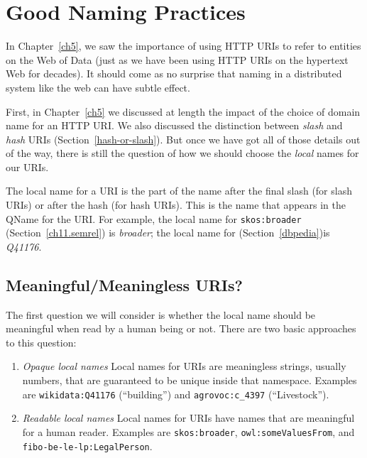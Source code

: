

\section{Good Naming Practices}

In Chapter~\ref{ch5}, we saw the importance of using HTTP URIs to refer to entities
on the Web of Data (just as we have been using HTTP URIs on the hypertext Web for decades).
It should come as no surprise that naming in a distributed system like the web
can have subtle effect. 

First, in Chapter~\ref{ch5} we discussed at length the impact of the choice of 
domain name for an HTTP URI.   We also discussed the distinction between \emph{slash} and 
\emph{hash} URIs (Section~\ref{hash-or-slash}).  But once we have got all of those details 
out of the way, there is still the question of how we should choose the \emph{local} names 
for our URIs. 

The local name for a URI is the part of the name after the final slash (for slash URIs) or 
after the hash (for hash URIs).  This is the name that appears in the QName for the URI. 
For example, the local name for \texttt{skos:broader}  (Section~\ref{ch11.semrel}) is 
\emph{broader}; the local name for  (Section~\ref{dbpedia})is 
\emph{Q41176}. 

\subsection{Meaningful/Meaningless URIs?}

The first question we will consider is whether the local name should be meaningful
when read by a human being or not.  There are two basic approaches to this question: 

\begin{enumerate}
    \item \emph{Opaque local names} Local names for URIs are meaningless strings, usually numbers, that are guaranteed to be unique inside that namespace.  Examples are \texttt{wikidata:Q41176} (``building'') and \texttt{agrovoc:c\_4397} (``Livestock''). 
    \item \emph{Readable local names} Local names for URIs have names that are meaningful
    for a human reader.  Examples are \texttt{skos:broader}, \texttt{owl:someValuesFrom}, and \texttt{fibo-be-le-lp:LegalPerson}.
\end{enumerate}

